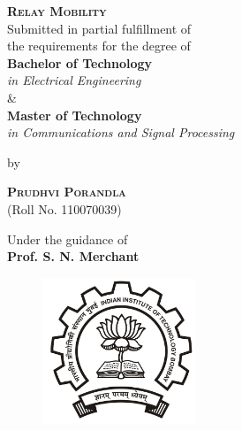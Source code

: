 \begin{titlepage}
    \begin{center}
	\textbf{%
	\vspace{0.05in}
	\Large{\textsc{Relay Mobility}}\\ \vspace{0.1in}
	}
	\vspace{0.5in}
	\large Submitted in partial fulfillment of\\
	the requirements for the degree of\\
	\vspace{0.3in}
	\textbf{Bachelor of Technology} \\ \emph{in Electrical Engineering} \\ \& \\ \textbf{Master of Technology} \\ \emph{in Communications and Signal Processing}\\ \vspace{0.05in}

	\vspace{0.30in}
	\large{by}\\
	\vspace{0.30in}

	\large{\textsc{\textbf{Prudhvi Porandla}}}\\(Roll No. 110070039)

	\vspace{0.6in}
        \normalsize{Under the guidance of}\\ \vspace{0.1in}
	\textbf{\large{	Prof. S. N. Merchant
}}\\
	\vspace{0.2in}

	\begin{figure}[h]
	\begin{center}
	\includegraphics[width=1.8in]{images/logo.jpg}
	\end{center}
	\end{figure}


\end{center}
\end{titlepage}

